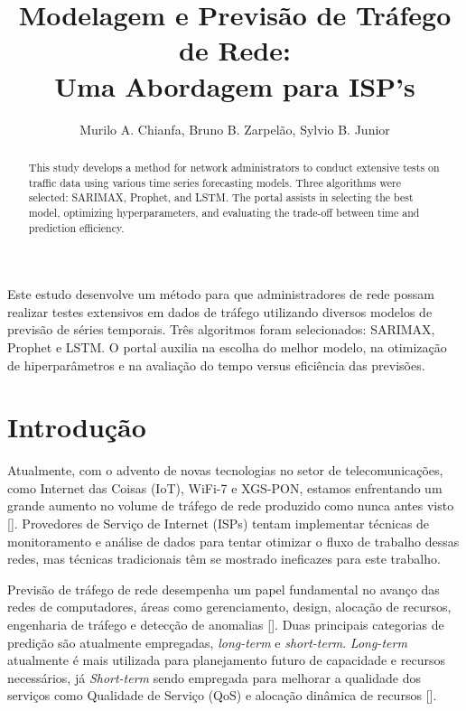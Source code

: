 \documentclass[12pt]{article}
\title{Modelagem e Previsão de Tráfego de Rede:\\ Uma Abordagem para ISP's}
\author{Murilo A. Chianfa\inst{1}, Bruno B. Zarpelão\inst{1}, Sylvio B. Junior\inst{2} }
\begin{document}
 

\maketitle

\begin{abstract}
  This study develops a method for network administrators to conduct extensive tests on traffic data using various time series forecasting models. Three algorithms were selected: SARIMAX, Prophet, and LSTM. The portal assists in selecting the best model, optimizing hyperparameters, and evaluating the trade-off between time and prediction efficiency.
\end{abstract}
     
\begin{resumo} 
  Este estudo desenvolve um método para que administradores de rede possam realizar testes extensivos em dados de tráfego utilizando diversos modelos de previsão de séries temporais. Três algoritmos foram selecionados: SARIMAX, Prophet e LSTM. O portal auxilia na escolha do melhor modelo, na otimização de hiperparâmetros e na avaliação do tempo versus eficiência das previsões.
\end{resumo}


\section{Introdução}

Atualmente, com o advento de novas tecnologias no setor de telecomunicações, como Internet das Coisas (IoT),  WiFi-7 e XGS-PON, estamos enfrentando um grande aumento no volume de tráfego de rede produzido como nunca antes visto [\cite{fleischer_using_2017}]. Provedores de Serviço de Internet (ISPs) tentam implementar técnicas de monitoramento e análise de dados para tentar otimizar o fluxo de trabalho dessas redes, mas técnicas tradicionais têm se mostrado ineficazes para este trabalho.

Previsão de tráfego de rede desempenha um papel fundamental no avanço das redes de computadores, áreas como gerenciamento, design, alocação de recursos, engenharia de tráfego e detecção de anomalias [\cite{troia_identification_2017}]. Duas principais categorias de predição são atualmente empregadas, \textit{long-term} e \textit{short-term}. \textit{Long-term} atualmente é mais utilizada para planejamento futuro de capacidade e recursos necessários, já \textit{Short-term} sendo empregada para melhorar a qualidade dos serviços como Qualidade de Serviço (QoS) e alocação dinâmica de recursos [\cite{andreoletti_network_2019}].
\end{document}
